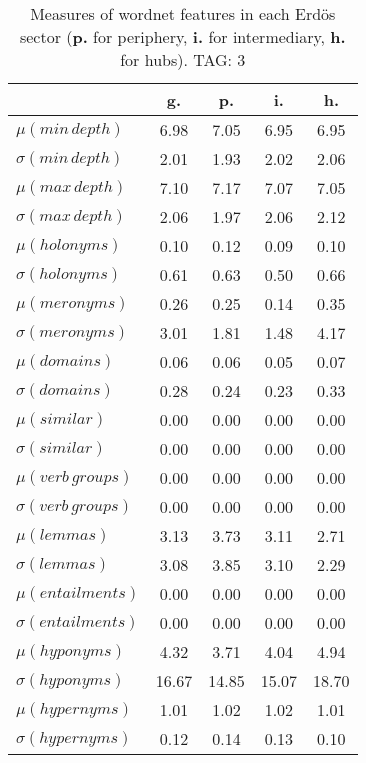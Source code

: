 \begin{table}[h!]
\begin{center}
\begin{tabular}{| l | c | c | c | c |}\hline
 & g. & p. & i. & h. \\\hline
$\mu(min\,depth)$ & 6.98  & 7.05  & 6.95  & 6.95 \\\hline
$\sigma(min\,depth)$ & 2.01  & 1.93  & 2.02  & 2.06 \\\hline
$\mu(max\,depth)$ & 7.10  & 7.17  & 7.07  & 7.05 \\\hline
$\sigma(max\,depth)$ & 2.06  & 1.97  & 2.06  & 2.12 \\\hline
$\mu(holonyms)$ & 0.10  & 0.12  & 0.09  & 0.10 \\\hline
$\sigma(holonyms)$ & 0.61  & 0.63  & 0.50  & 0.66 \\\hline
$\mu(meronyms)$ & 0.26  & 0.25  & 0.14  & 0.35 \\\hline
$\sigma(meronyms)$ & 3.01  & 1.81  & 1.48  & 4.17 \\\hline
$\mu(domains)$ & 0.06  & 0.06  & 0.05  & 0.07 \\\hline
$\sigma(domains)$ & 0.28  & 0.24  & 0.23  & 0.33 \\\hline
$\mu(similar)$ & 0.00  & 0.00  & 0.00  & 0.00 \\\hline
$\sigma(similar)$ & 0.00  & 0.00  & 0.00  & 0.00 \\\hline
$\mu(verb\,groups)$ & 0.00  & 0.00  & 0.00  & 0.00 \\\hline
$\sigma(verb\,groups)$ & 0.00  & 0.00  & 0.00  & 0.00 \\\hline
$\mu(lemmas)$ & 3.13  & 3.73  & 3.11  & 2.71 \\\hline
$\sigma(lemmas)$ & 3.08  & 3.85  & 3.10  & 2.29 \\\hline
$\mu(entailments)$ & 0.00  & 0.00  & 0.00  & 0.00 \\\hline
$\sigma(entailments)$ & 0.00  & 0.00  & 0.00  & 0.00 \\\hline
$\mu(hyponyms)$ & 4.32  & 3.71  & 4.04  & 4.94 \\\hline
$\sigma(hyponyms)$ & 16.67  & 14.85  & 15.07  & 18.70 \\\hline
$\mu(hypernyms)$ & 1.01  & 1.02  & 1.02  & 1.01 \\\hline
$\sigma(hypernyms)$ & 0.12  & 0.14  & 0.13  & 0.10 \\\hline
\end{tabular}
\caption{Measures of wordnet features in each Erd\"os sector ({{\bf p.}} for periphery, {{\bf i.}} for intermediary, {{\bf h.}} for hubs). TAG: 3}
\end{center}
\end{table}